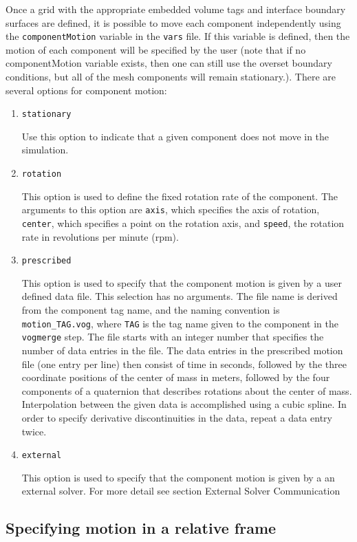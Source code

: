 \documentclass{article}
\begin{document}
Once a grid with the appropriate embedded volume tags and interface
boundary surfaces are defined, it is possible to move each component
independently using the {\tt componentMotion} variable in the {\tt vars}
file.  If this variable is defined, then the motion of each component will be specified by the user (note that if no componentMotion variable exists, then one can still use the overset boundary conditions, but all of the mesh components will remain stationary.).  There are several options for component motion:
\begin{enumerate}
\item {\tt stationary} 

Use this option to indicate that a given component does not move in
the simulation.
\item {\tt rotation}

This option is used to define the fixed rotation rate of the component.
The arguments to this option are {\tt axis},
which specifies the axis of rotation, {\tt center}, which specifies a
point on the rotation axis, and {\tt speed}, the rotation rate in
revolutions per minute (rpm).

\item {\tt prescribed}

This option is used to specify that the component motion is
given by a user defined data file.  This selection has no
arguments.  The file name is derived from the component tag name,
and the naming convention is {\tt motion\_TAG.vog}, where {\tt TAG} is
the tag name given to the component in the {\tt
  vogmerge} step.  The file starts with an integer number that specifies
the number of data entries in the file.
The data entries in the prescribed motion file (one entry per line) then
consist of time in seconds, followed by the three coordinate
positions of the center of mass in meters, followed by the four
components of a quaternion that describes rotations about the center
of mass.  Interpolation between the given data is accomplished using a cubic
spline.  In order to specify derivative discontinuities in the data,
repeat a data entry twice.

\item {\tt external}

This option is used to specify that the component motion is
given by a an external solver. For more detail see section External Solver Communication

\end{enumerate}

\subsection{Specifying motion in a relative frame}
\end{document}
